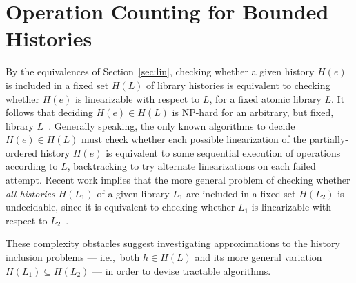 \section{Operation Counting for Bounded Histories}

By the equivalences of Section~\ref{sec:lin}, checking whether a given history
$H(e)$ is included in a fixed set $H(L)$ of library histories is equivalent to
checking whether $H(e)$ is linearizable with respect to $L$, for a fixed atomic
library $L$. It follows that deciding $H(e) \in H(L)$ is NP-hard for an
arbitrary, but fixed, library $L$~\cite{journals/siamcomp/GibbonsK97}.
Generally speaking, the only known algorithms to decide $H(e) \in H(L)$ must
check whether each possible linearization of the partially-ordered history
$H(e)$ is equivalent to some sequential execution of operations according to
$L$, backtracking to try alternate linearizations on each failed attempt.
Recent work implies that the more general problem of checking whether \emph{all
histories} $H(L_1)$ of a given library $L_1$ are included in a fixed set
$H(L_2)$ is undecidable, since it is equivalent to checking whether $L_1$ is
linearizable with respect to $L_2$~\cite{conf/esop/BouajjaniEEH13}.

These complexity obstacles suggest investigating approximations to the history
inclusion problems --- i.e.,~both $h \in H(L)$ and its more general variation
$H(L_1) \subseteq H(L_2)$ --- in order to devise tractable algorithms.

